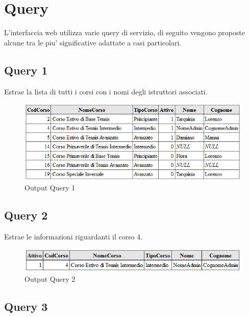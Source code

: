\chapter{Query} 
L'interfaccia web utilizza varie query di servizio, di seguito vengono proposte alcune tra le piu' significative adattate a casi particolari.

\section{Query 1}

Estrae la lista di tutti i corsi con i nomi degli istruttori associati.\\



\begin{figure}[H]
 \centering
  \includegraphics[width=\textwidth]{images/Query1.PNG}
\caption{Output Query 1}
\end{figure}
\newpage
\section{Query 2}

Estrae le informazioni riguardanti il corso 4.\\



\begin{figure}[H]
 \centering
  \includegraphics[width=\textwidth]{images/Query2.PNG}
\caption{Output Query 2}
\end{figure}

\newpage
\section{Query 3}


